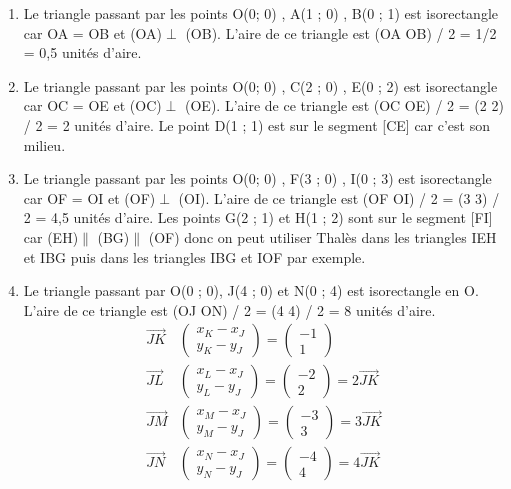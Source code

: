 \documentclass[11pt]{article}
\begin{document}
\begin{enumerate}
\item Le triangle passant par les points O(0; 0) , A(1 ; 0) , B(0 ; 1)
est isorectangle car OA = OB et (OA)\(\perp\) (OB).
L'aire de ce triangle est (OA\texttimes{} OB) / 2 = 1/2 = 0,5 unités
d'aire.
\item Le triangle passant par les points O(0; 0) , C(2 ; 0) , E(0 ; 2)
est isorectangle car OC = OE et (OC)\(\perp\) (OE).
L'aire de ce triangle est (OC\texttimes{} OE) / 2 = (2\texttimes{} 2) / 2 = 2
unités d'aire.
Le point D(1 ; 1) est sur le segment [CE] car c'est son milieu.
\item Le triangle passant par les points O(0; 0) , F(3 ; 0) , I(0 ; 3)
est isorectangle car OF = OI et (OF)\(\perp\) (OI).
L'aire de ce triangle est (OF\texttimes{} OI) / 2 = (3\texttimes{} 3) / 2 = 4,5
unités d'aire.
Les points G(2 ; 1) et H(1 ; 2) sont sur le segment [FI] car
(EH)\(\parallel\) (BG)\(\parallel\) (OF) donc on peut utiliser Thalès
dans les triangles IEH et IBG puis dans les triangles IBG et IOF
par exemple.
\item Le triangle passant par O(0 ; 0), J(4 ; 0) et N(0 ; 4) est
isorectangle en O.
L'aire de ce triangle est 
      (OJ\texttimes{} ON) / 2 = (4\texttimes{} 4) / 2 = 8 unités d'aire.
\begin{align*}
     \overrightarrow{JK}&\begin{pmatrix}x_K - x_J\\ y_K - y_J\end{pmatrix}=\begin{pmatrix}-1\\1\end{pmatrix}\\
     \overrightarrow{JL}&\begin{pmatrix}x_L - x_J\\ y_L - y_J\end{pmatrix}=\begin{pmatrix}-2\\ 2\end{pmatrix} = 2\overrightarrow{JK}\\
     \overrightarrow{JM}&\begin{pmatrix}x_M - x_J\\ y_M - y_J\end{pmatrix}=\begin{pmatrix}-3\\ 3\end{pmatrix} = 3\overrightarrow{JK}\\
     \overrightarrow{JN}&\begin{pmatrix}x_N - x_J\\ y_N - y_J\end{pmatrix}=\begin{pmatrix}-4\\ 4\end{pmatrix} = 4\overrightarrow{JK}

\end{align*}
\end{enumerate}
\end{document}
